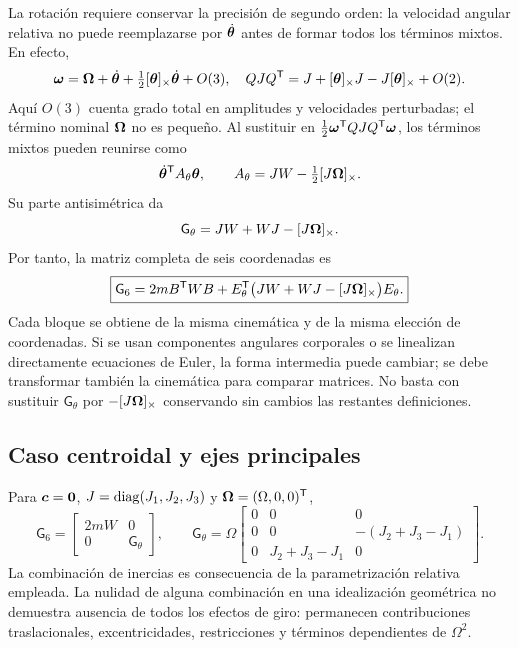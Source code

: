 La rotación requiere conservar la precisión de segundo orden: la velocidad angular relativa no puede reemplazarse por $\dot{\bm{\theta}}$ antes de formar todos los términos mixtos. En efecto,
\begin{equation}
 \bm{\omega}=\bm{\Omega}+\dot{\bm{\theta}}
 +\tfrac12[\bm{\theta}]_\times\dot{\bm{\theta}}+O(3),
 \quad QJQ^{\mathsf T}=J+[\bm{\theta}]_\times J-J[\bm{\theta}]_\times+O(2).
\end{equation}
Aquí $O(3)$ cuenta grado total en amplitudes y velocidades perturbadas; el término nominal $\bm{\Omega}$ no es pequeño. Al sustituir en $\tfrac12\bm{\omega}^{\mathsf T}QJQ^{\mathsf T}\bm{\omega}$, los términos mixtos pueden reunirse como
\begin{equation}
 \dot{\bm{\theta}}^{\mathsf T}A_\theta\bm{\theta},
 \qquad A_\theta=JW-\tfrac12[J\bm{\Omega}]_\times.
\end{equation}
Su parte antisimétrica da
\begin{equation}
 \mathsf G_\theta=JW+WJ-[J\bm{\Omega}]_\times.
\end{equation}
Por tanto, la matriz completa de seis coordenadas es
\begin{equation}
 \boxed{\mathsf G_6=2mB^{\mathsf T}WB+
 E_\theta^{\mathsf T}\bigl(JW+WJ-[J\bm{\Omega}]_\times\bigr)E_\theta.}
 \label{eq:G6}
\end{equation}
Cada bloque se obtiene de la misma cinemática y de la misma elección de coordenadas. Si se usan componentes angulares corporales o se linealizan directamente ecuaciones de Euler, la forma intermedia puede cambiar; se debe transformar también la cinemática para comparar matrices. No basta con sustituir $\mathsf G_\theta$ por $-[J\bm{\Omega}]_\times$ conservando sin cambios las restantes definiciones.

\subsection{Caso centroidal y ejes principales}
Para $\bm{c}=\bm{0}$, $J=\operatorname{diag}(J_1,J_2,J_3)$ y $\bm{\Omega}=(\Omega,0,0)^{\mathsf T}$,
\begin{equation}
 \mathsf G_6=\begin{bmatrix}2mW&0\\0&\mathsf G_\theta\end{bmatrix},
 \qquad
 \mathsf G_\theta=\Omega
 \begin{bmatrix}0&0&0\\0&0&-(J_2+J_3-J_1)\\0&J_2+J_3-J_1&0\end{bmatrix}.
\end{equation}
La combinación de inercias es consecuencia de la parametrización relativa empleada. La nulidad de alguna combinación en una idealización geométrica no demuestra ausencia de todos los efectos de giro: permanecen contribuciones traslacionales, excentricidades, restricciones y términos dependientes de $\Omega^2$.

